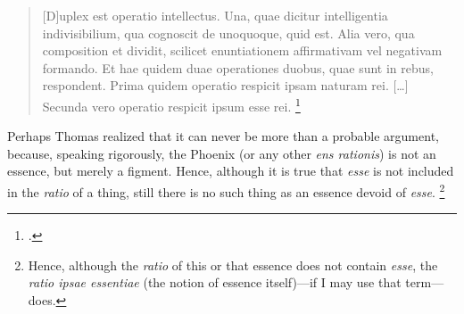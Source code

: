 \begin{quotation}
[D]uplex est operatio intellectus. Una, quae dicitur intelligentia indivisibilium, qua cognoscit de unoquoque, quid est. Alia vero, qua composition et dividit, scilicet enuntiationem affirmativam vel negativam formando. Et hae quidem duae operationes duobus, quae sunt in rebus, respondent. Prima quidem operatio respicit ipsam naturam rei. [\ldots]  Secunda vero operatio respicit ipsum esse rei.%
%
\footnote{\Cite[pars~3, q.~5 a.~3 co.]{st:detrinitate}.}
\end{quotation}
%
Perhaps Thomas realized that it can never be more than a probable argument, because, speaking rigorously, the Phoenix (or any other \emph{ens rationis}) is not an essence, but merely a figment. Hence, although it is true that \emph{esse} is not included in the \emph{ratio} of a thing, still there is no such thing as an essence devoid of \emph{esse}.%
%
\footnote{Hence, although the \emph{ratio} of this or that essence does not contain \emph{esse}, the \emph{ratio ipsae essentiae} (the notion of essence itself)—if I may use that term—does.}

